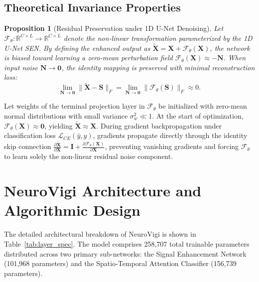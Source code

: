 \documentclass[conference]{IEEEtran}
\newtheorem{proposition}{Proposition}
\begin{document}
\subsection{Theoretical Invariance Properties}
\begin{proposition}[Residual Preservation under 1D U-Net Denoising]
\label{prop:residual}
Let $\mathcal{F}_{\theta}: \mathbb{R}^{C \times L} \to \mathbb{R}^{C \times L}$ denote the non-linear transformation parameterized by the 1D U-Net SEN. By defining the enhanced output as $\mathbf{\tilde{X}} = \mathbf{X} + \mathcal{F}_{\theta}(\mathbf{X})$, the network is biased toward learning a zero-mean perturbation field $\mathcal{F}_{\theta}(\mathbf{X}) \approx -\mathbf{N}$. When input noise $\mathbf{N} \to \mathbf{0}$, the identity mapping is preserved with minimal reconstruction loss:
\begin{equation}
    \lim_{\mathbf{N} \to \mathbf{0}} \|\mathbf{\tilde{X}} - \mathbf{S}\|_F = \lim_{\mathbf{N} \to \mathbf{0}} \|\mathcal{F}_{\theta}(\mathbf{S})\|_F \approx 0.
\end{equation}
\end{proposition}

\begin{IEEEproof}
Let weights of the terminal projection layer in $\mathcal{F}_{\theta}$ be initialized with zero-mean normal distributions with small variance $\sigma_w^2 \ll 1$. At the start of optimization, $\mathcal{F}_{\theta}(\mathbf{X}) \approx \mathbf{0}$, yielding $\mathbf{\tilde{X}} \approx \mathbf{X}$. During gradient backpropagation under classification loss $\mathcal{L}_{CE}(\hat{y}, y)$, gradients propagate directly through the identity skip connection $\frac{\partial \mathbf{\tilde{X}}}{\partial \mathbf{X}} = \mathbf{I} + \frac{\partial \mathcal{F}_{\theta}(\mathbf{X})}{\partial \mathbf{X}}$, preventing vanishing gradients and forcing $\mathcal{F}_{\theta}$ to learn solely the non-linear residual noise component.
\end{IEEEproof}

\section{NeuroVigi Architecture and Algorithmic Design}
\label{sec:architecture}

The detailed architectural breakdown of NeuroVigi is shown in Table~\ref{tab:layer_spec}. The model comprises 258,707 total trainable parameters distributed across two primary sub-networks: the Signal Enhancement Network (101,968 parameters) and the Spatio-Temporal Attention Classifier (156,739 parameters).
\end{document}
